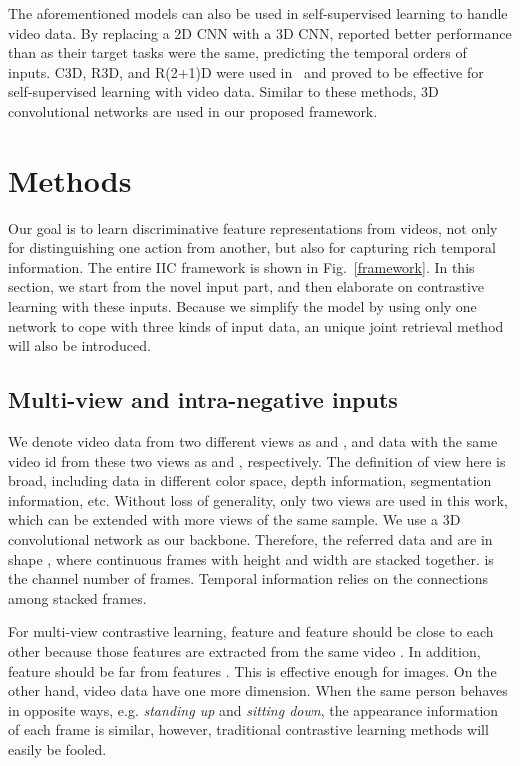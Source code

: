 \documentclass[sigconf]{acmart}
\begin{document}
The aforementioned models can also be used in self-supervised learning to handle video data. By replacing a 2D CNN with a 3D CNN, \cite{xu2019self} reported better performance than \cite{lee2017unsupervised} as their target tasks were the same, predicting the temporal orders of inputs. C3D, R3D, and R(2+1)D were used in~\cite{xu2019self,luo2020video} and proved to be effective for self-supervised learning with video data. Similar to these methods, 3D convolutional networks are used in our proposed framework. 

\section{Methods}
Our goal is to learn discriminative feature representations from videos, not only for distinguishing one action from another, but also for capturing rich temporal information. The entire IIC framework is shown in Fig.~\ref{framework}. In this section, we start from the novel input part, and then elaborate on contrastive learning with these inputs. Because we simplify the model by using only one network to cope with three kinds of input data, an unique joint retrieval method will also be introduced.

\subsection{Multi-view and intra-negative inputs}
\label{intraneg}
We denote video data from two different views as  and , and data with the same video id  from these two views as  and , respectively. The definition of view here is broad, including data in different color space, depth information, segmentation information, etc.  Without loss of generality, only two views are used in this work, which can be extended with more views of the same sample. We use a 3D convolutional network as our backbone. Therefore, the referred data  and  are in shape , where  continuous frames with height  and width  are stacked together.  is the channel number of frames. Temporal information relies on the connections among  stacked frames.

For multi-view contrastive learning, feature  and feature  should be close to each other because those features are extracted from the same video . In addition, feature  should be far from features . This is effective enough for images. On the other hand, video data have one more dimension. When the same person behaves in opposite ways, e.g. \textit{standing up} and \textit{sitting down}, the appearance information of each frame is similar, however, traditional contrastive learning methods will easily be fooled. 
\end{document}
